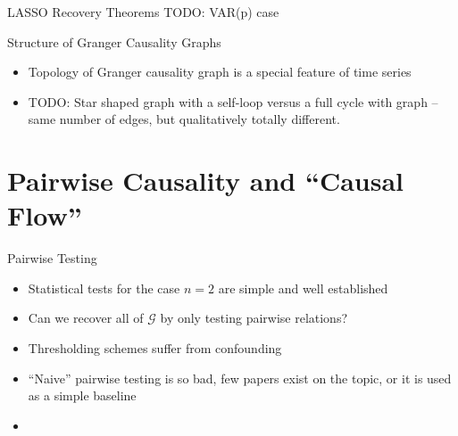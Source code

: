 \documentclass{beamer} %
\def\gcg{\mathcal{G}}  %
\newcommand{\anc}[1]{\mathcal{A}(#1)}  %
\newcommand{\gcgpath}[2]{#1 \rightarrow \cdots \rightarrow #2}  %
\begin{document}
\begin{frame}{LASSO Recovery Theorems}
  TODO: VAR(p) case
\end{frame}

\begin{frame}{Structure of Granger Causality Graphs}
  \begin{itemize}
    \item{Topology of Granger causality graph is a special feature of time series}\pause
    \item{TODO: Star shaped graph with a self-loop versus a full cycle with graph -- same number of edges, but qualitatively totally different.}
  \end{itemize}
\end{frame}

\section{Pairwise Causality and ``Causal Flow''}
\begin{frame}{Pairwise Testing}
  \begin{itemize}
    \item{Statistical tests for the case $n = 2$ are simple and well established}\pause
    \item{Can we recover all of $\gcg$ by only testing pairwise relations?}\pause
    \item{Thresholding schemes suffer from confounding}\pause
    \item{``Naive'' pairwise testing is so bad, few papers exist on the topic, or it is used as a simple baseline}\pause
    \item{}
  \end{itemize}
\end{frame}
\end{document}
